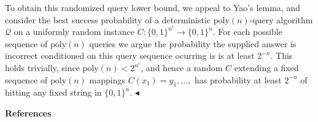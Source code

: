 To obtain this randomized query lower bound, we appeal to Yao’s lemma, and consider the best success probability of a deterministic $\mathrm{poly}(n)$-query algorithm $\mathcal{Q}$ on a uniformly random instance $C:\{0,1\}^{n^{\epsilon}}\to\{0,1\}^{n}$. For each possible sequence of $\mathrm{poly}(n)$ queries we argue the probability the supplied answer is incorrect conditioned on this query sequence ocurring is is at least $2^{-n}$. This holds trivially, since $\mathrm{poly}(n)<2^{n^{\epsilon}}$, and hence a random $C$ extending a fixed sequence of $\mathrm{poly}(n)$ mappings $C(x_{1})=y_{1},\ldots,$ has probability at least $2^{-n}$ of hitting any fixed string in $\{0,1\}^{n}$.
$\blacktriangleleft$\par







\par\medskip\noindent\textbf{References}\par



